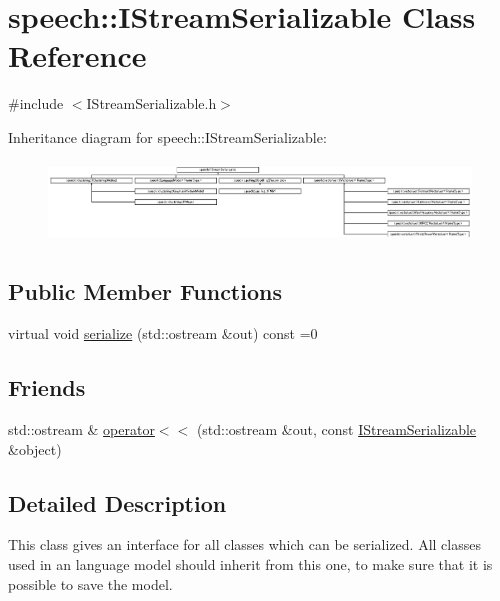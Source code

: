 \hypertarget{classspeech_1_1IStreamSerializable}{\section{speech\+:\+:I\+Stream\+Serializable Class Reference}
\label{classspeech_1_1IStreamSerializable}
}


{\ttfamily \#include $<$I\+Stream\+Serializable.\+h$>$}

Inheritance diagram for speech\+:\+:I\+Stream\+Serializable\+:\begin{figure}[H]
\begin{center}
\leavevmode
\includegraphics[height=2.165746cm]{classspeech_1_1IStreamSerializable}
\end{center}
\end{figure}
\subsection*{Public Member Functions}
\begin{DoxyCompactItemize}
\item 
virtual void \hyperlink{classspeech_1_1IStreamSerializable_a891561ebe3e4eb5411e613b28bc2c982}{serialize} (std\+::ostream \&out) const =0
\end{DoxyCompactItemize}
\subsection*{Friends}
\begin{DoxyCompactItemize}
\item 
std\+::ostream \& \hyperlink{classspeech_1_1IStreamSerializable_ae1962586a37479716e14c3d8ed3beaca}{operator$<$$<$} (std\+::ostream \&out, const \hyperlink{classspeech_1_1IStreamSerializable}{I\+Stream\+Serializable} \&object)
\end{DoxyCompactItemize}


\subsection{Detailed Description}
This class gives an interface for all classes which can be serialized. All classes used in an language model should inherit from this one, to make sure that it is possible to save the model. 

